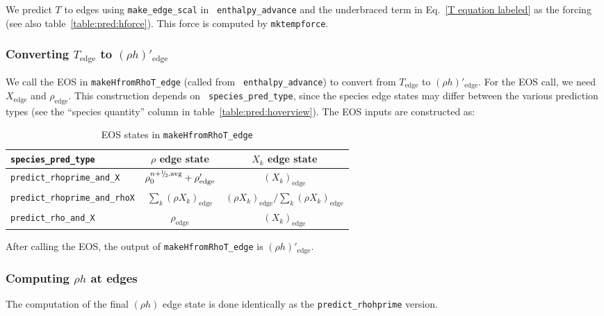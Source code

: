 We predict $T$ to edges using {\tt make\_edge\_scal} in {\tt
  enthalpy\_advance} and the underbraced term in Eq.~\ref{T equation
  labeled} as the forcing (see also table~\ref{table:pred:hforce}).
This force is computed by {\tt mktempforce}.

\subsubsection{Converting $T_\mathrm{edge}$ to $(\rho h)'_\mathrm{edge}$}

We call the EOS in {\tt makeHfromRhoT\_edge} (called from {\tt
  enthalpy\_advance}) to convert from $T_\mathrm{edge}$ to $(\rho
h)'_\mathrm{edge}$.  For the EOS call, we need $X_\mathrm{edge}$ and
$\rho_\mathrm{edge}$.  This construction depends on {\tt
  species\_pred\_type}, since the species edge states may differ
between the various prediction types (see the ``species quantity''
column in table~\ref{table:pred:hoverview}).  The EOS inputs are
constructed as:

\begin{table*}[h]
\centering
\caption{EOS states in {\tt makeHfromRhoT\_edge}\newline}
\label{table:pred:EOSinputs}
\renewcommand{\arraystretch}{1.5}
\begin{tabular}{l|c|c}
\hline
\hline
{\tt species\_pred\_type} & {$\rho$ edge state} &   {$X_k$ edge state}  \\
\hline
{\tt predict\_rhoprime\_and\_X} & 
  $\rho_0^{n+\myhalf,\rm{avg}} + \rho'_\mathrm{edge}$ & 
  $(X_k)_\mathrm{edge}$ \\
{\tt predict\_rhoprime\_and\_rhoX} & 
  $\sum_k (\rho X_k)_\mathrm{edge}$ & 
  $(\rho X_k)_\mathrm{edge}/\sum_k (\rho X_k)_\mathrm{edge}$ \\
{\tt predict\_rho\_and\_X} & 
  $\rho_\mathrm{edge}$ & 
  $(X_k)_\mathrm{edge}$ \\
\hline
\end{tabular}
\end{table*}

After calling the EOS, the output of {\tt makeHfromRhoT\_edge} is
$(\rho h)'_\mathrm{edge}$.

\subsubsection{Computing $\rho h$ at edges}

The computation of the final $(\rho h)$ edge state is done identically
as the {\tt predict\_rhohprime} version.



